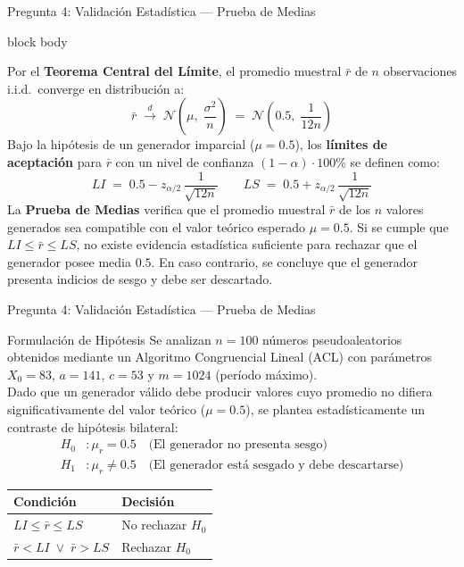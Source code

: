 \documentclass[aspectratio=169, 10pt]{beamer}
\newenvironment{emptyblock}
{
  \begin{beamercolorbox}[
      wd=\linewidth,
      sep=0.2cm,
      rounded=true
    ]{block body}
}
{
  \end{beamercolorbox}
}
\begin{document}
\begin{frame}{Pregunta 4: Validación Estadística — Prueba de Medias}
	\begin{emptyblock}
		\justifying
		Por el \textbf{Teorema Central del Límite}, el promedio muestral
		$\bar{r}$ de $n$ observaciones i.i.d.\ converge en distribución a:
		\[
			\bar{r} \;\xrightarrow{d}\; \mathcal{N}\!\left(\mu,\;\frac{\sigma^2}{n}\right)
			\;=\; \mathcal{N}\!\left(0.5,\;\frac{1}{12n}\right)
		\]
		Bajo la hipótesis de un generador imparcial ($\mu = 0.5$), los
		\textbf{límites de aceptación} para $\bar{r}$ con un nivel de
		confianza $(1-\alpha)\cdot 100\%$ se definen como:
		\[
			\boxed{
				LI \;=\; 0.5 - z_{\alpha/2}\,\dfrac{1}{\sqrt{12n}}
				\qquad
				LS \;=\; 0.5 + z_{\alpha/2}\,\dfrac{1}{\sqrt{12n}}
			}
		\]
		La \textbf{Prueba de Medias} verifica que el promedio muestral
		$\bar{r}$ de los $n$ valores generados sea compatible con
		el valor teórico esperado $\mu=0.5$. Si se cumple que $LI \le \bar{r} \le LS$, no existe
		evidencia estadística suficiente para rechazar que el generador posee
		media $0.5$. En caso contrario, se concluye que el generador presenta
		indicios de sesgo y debe ser descartado.
	\end{emptyblock}
\end{frame}

\begin{frame}{Pregunta 4: Validación Estadística — Prueba de Medias}
	\begin{exampleblock}{Formulación de Hipótesis}
		\justifying
		Se analizan $n = 100$ números pseudoaleatorios obtenidos mediante un
		Algoritmo Congruencial Lineal (ACL) con parámetros $X_0 = 83$,
		$a = 141$, $c = 53$ y $m = 1024$ (período máximo).\\[6pt]
		Dado que un generador válido debe producir valores cuyo promedio no
		difiera significativamente del valor teórico ($\mu = 0.5$),
		se plantea estadísticamente un contraste de hipótesis bilateral:
		\begin{align*}
			H_0 & : \mu_r = 0.5 \quad \text{(El generador no presenta sesgo)}                  \\[6pt]
			H_1 & : \mu_r \neq 0.5 \quad \text{(El generador está sesgado y debe descartarse)}
		\end{align*}
		\begin{center}
			\small
			\renewcommand{\arraystretch}{1.3}
			\setlength{\tabcolsep}{12pt}
			\begin{tabular}{ll}
				\toprule
				\textbf{Condición}                   & \textbf{Decisión} \\
				\midrule
				$LI \leq \bar{r} \leq LS$            & No rechazar $H_0$ \\
				$\bar{r} < LI \;\lor\; \bar{r} > LS$ & Rechazar $H_0$    \\
				\bottomrule
			\end{tabular}
		\end{center}
	\end{exampleblock}
\end{frame}
\end{document}
